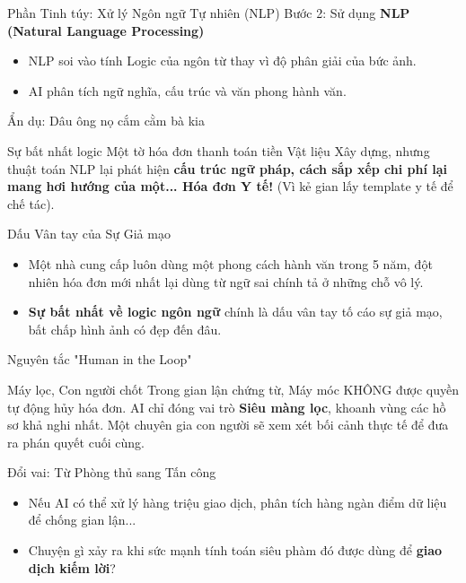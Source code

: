 \documentclass[aspectratio=169]{beamer}
\begin{document}
\begin{frame}{Phần Tinh túy: Xử lý Ngôn ngữ Tự nhiên (NLP)}
    Bước 2: Sử dụng \textbf{NLP (Natural Language Processing)}
    \begin{itemize}
        \item NLP soi vào tính Logic của ngôn từ thay vì độ phân giải của bức ảnh.
        \item AI phân tích ngữ nghĩa, cấu trúc và văn phong hành văn.
    \end{itemize}
\end{frame}

\begin{frame}{Ẩn dụ: Dâu ông nọ cắm cằm bà kia}
    \begin{exampleblock}{Sự bất nhất logic}
        Một tờ hóa đơn thanh toán tiền Vật liệu Xây dựng, nhưng thuật toán NLP lại phát hiện \textbf{cấu trúc ngữ pháp, cách sắp xếp chi phí lại mang hơi hướng của một... Hóa đơn Y tế!} (Vì kẻ gian lấy template y tế để chế tác).
    \end{exampleblock}
\end{frame}

\begin{frame}{Dấu Vân tay của Sự Giả mạo}
    \begin{itemize}
        \item Một nhà cung cấp luôn dùng một phong cách hành văn trong 5 năm, đột nhiên hóa đơn mới nhất lại dùng từ ngữ sai chính tả ở những chỗ vô lý.
        \item \textbf{Sự bất nhất về logic ngôn ngữ} chính là dấu vân tay tố cáo sự giả mạo, bất chấp hình ảnh có đẹp đến đâu.
    \end{itemize}
\end{frame}

\begin{frame}{Nguyên tắc "Human in the Loop"}
    \begin{alertblock}{Máy lọc, Con người chốt}
        Trong gian lận chứng từ, Máy móc KHÔNG được quyền tự động hủy hóa đơn. AI chỉ đóng vai trò \textbf{Siêu màng lọc}, khoanh vùng các hồ sơ khả nghi nhất. Một chuyên gia con người sẽ xem xét bối cảnh thực tế để đưa ra phán quyết cuối cùng.
    \end{alertblock}
\end{frame}

\begin{frame}{Đổi vai: Từ Phòng thủ sang Tấn công}
    \begin{itemize}
        \item Nếu AI có thể xử lý hàng triệu giao dịch, phân tích hàng ngàn điểm dữ liệu để chống gian lận...
        \item Chuyện gì xảy ra khi sức mạnh tính toán siêu phàm đó được dùng để \textbf{giao dịch kiếm lời}?
    \end{itemize}
\end{frame}
\end{document}
